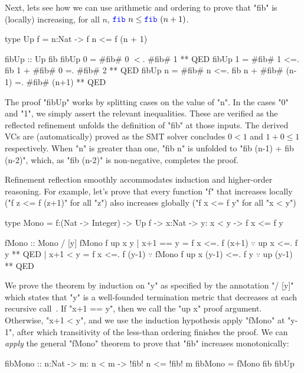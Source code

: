 %
Next, lets see how we can use arithmetic and ordering to
prove that "fib" is (locally) increasing, \ie for all $n$,
$\fib{n} \leq \fib{(n+1)}$.
%
\begin{mcode}
    type Up f = n:Nat -> { f n <= f (n + 1) }

    fibUp   :: Up fib
    fibUp 0 =  #fib# 0 $<$. #fib# 1                          ** QED
    fibUp 1 =  #fib# 1 <=. fib 1 + #fib# 0     =. #fib# 2     ** QED
    fibUp n =  #fib# n <=. fib n + #fib# (n-1) =. #fib# (n+1) ** QED
\end{mcode} %


%
The proof "fibUp" works by splitting cases on the value of "n".
%
In the cases "0" and "1", we simply assert
the relevant inequalities. These are verified as the
reflected refinement unfolds the definition of
"fib" at those inputs.
%
The derived VCs are (automatically) proved
as the SMT solver concludes $0 < 1$ and $1 + 0 \leq 1$
respectively.
%
When "n" is greater than one, "fib n" is unfolded
to  "fib (n-1) + fib (n-2)", which, as "fib (n-2)"
is non-negative, completes the proof.

%
Refinement reflection smoothly accommodates induction
and higher-order reasoning.
%
For example, let's prove that every function "f"
that increases locally (\ie "f z <= f (z+1)" for all "z")
also increases globally (\ie "f x <= f y" for all "x < y")
%
\begin{mcode}
    type Mono = f:(Nat -> Integer) -> Up f -> x:Nat -> y:{ x < y } -> { f x <= f y }

    fMono :: Mono / [y]
    fMono f up x y
      | x+1 == y = f x <=. f (x+1) $\because$ up x <=. f y                          ** QED
      | x+1  < y = f x <=. f (y-1) $\because$ fMono f up x (y-1) <=. f y $\because$ up (y-1) ** QED
\end{mcode}
%
We prove the theorem by induction
on "y" as specified by the
annotation "/ [y]" which states
that "y" is a well-founded
termination metric that decreases
at each recursive call~\citep{Vazou14}.
%
If "x+1 == y", then we call the "up x" proof argument.
%
Otherwise, "x+1 < y", and we use
the induction hypothesis \ie apply
"fMono" at "y-1", after which
transitivity of the less-than
ordering finishes the proof.
%
We can \emph{apply} the general
"fMono" theorem to prove that
"fib" increases monotonically:
%
\begin{mcode}
    fibMono :: n:Nat -> m:{ n < m } -> { !fib! n <= !fib! m }
    fibMono = fMono fib fibUp
\end{mcode}

